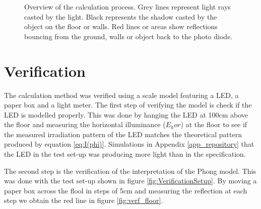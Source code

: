 \begin{figure}
	\centering     %
	\label{fig:raytracing}
	\caption{Overview of the calculation process. Grey lines represent light rays casted by the light. Black represents the shadow casted by the object on the floor or walls. Red lines or areas show reflections bouncing from the ground, walls or object back to the photo diode.}
\end{figure}

\section{Verification}
\label{sec:verification}
The calculation method was verified using a scale model featuring a LED\cite{lamptest}, a paper box and a light meter\cite{LuxMeter}. The first step of verifying the model is check if the LED is modelled properly. This was done by hanging the LED at 100cm above the floor and measuring the horizontal illuminance ($E_hor$) at the floor to see if the measured irradiation pattern of the LED matches the theoretical pattern produced by equation \ref{eq:I(phi)}. Simulations in Appendix \ref{app_repository} that the LED in the test set-up was producing more light than in the specification.

The second step is the verification of the interpretation of the Phong model. This was done with the test set-up shown in figure \ref{fig:VerificationSetup}. By moving a paper box across the flool in steps of 5cm and measuring the reflection at each step we obtain the red line in figure \ref{fig:verf_floor}.

